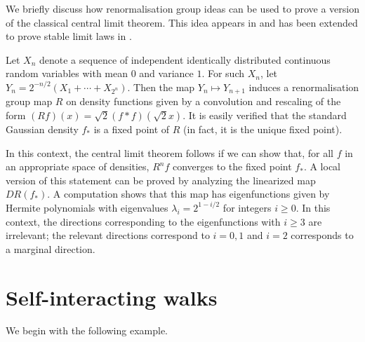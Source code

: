 \begin{example}
We briefly discuss how renormalisation group ideas can be used to prove a version
of the classical central limit theorem. This idea appears in \cite{JoLa01,KS07}
and has been extended to prove stable limit laws in \cite{LiSinai14}.

Let $X_n$ denote a sequence of independent identically distributed continuous random
variables with mean $0$ and variance $1$. For such $X_n$, let
$Y_n = 2^{-n/2} (X_1 + \cdots + X_{2^n})$. Then the map $Y_n \mapsto Y_{n+1}$
induces a renormalisation group map $R$ on density functions
given by a convolution and rescaling of the form $(R f)(x) = \sqrt2 (f * f)(\sqrt2 x)$.
It is easily verified that the standard Gaussian density $f_*$ is a fixed point of $R$
(in fact, it is the unique fixed point).

In this context, the central limit theorem follows if we can show that, for all $f$
in an appropriate space of densities, $R^n f$ converges to the fixed point $f_*$.
A local version of this statement can be proved by analyzing the linearized map
$D R(f_*)$. A computation shows that this map has eigenfunctions given by Hermite
polynomials with eigenvalues $\lambda_i = 2^{1-i/2}$ for integers $i \ge 0$.
In this context, the directions corresponding to the eigenfunctions with $i \ge 3$
are irrelevant; the relevant directions correspond to $i = 0, 1$ and $i = 2$ corresponds
to a marginal direction.
\end{example}


\section{Self-interacting walks}
\label{sec:walks}

We begin with the following example.

